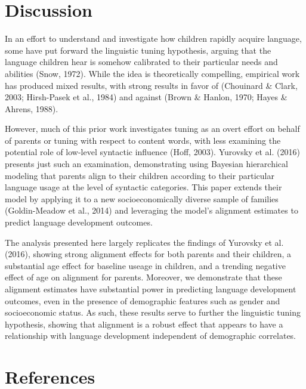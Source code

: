 \documentclass[10pt, letterpaper]{article}
\begin{document}
\hypertarget{discussion}{%
\section{Discussion}\label{discussion}}

In an effort to understand and investigate how children rapidly acquire
language, some have put forward the linguistic tuning hypothesis,
arguing that the language children hear is somehow calibrated to their
particular needs and abilities (Snow, 1972). While the idea is
theoretically compelling, empirical work has produced mixed results,
with strong results in favor of (Chouinard \& Clark, 2003; Hirsh-Pasek
et al., 1984) and against (Brown \& Hanlon, 1970; Hayes \& Ahrens,
1988).

However, much of this prior work investigates tuning as an overt effort
on behalf of parents or tuning with respect to content words, with less
examining the potential role of low-level syntactic influence (Hoff,
2003). Yurovsky et al. (2016) presents just such an examination,
demonstrating using Bayesian hierarchical modeling that parents align to
their children according to their particular language usage at the level
of syntactic categories. This paper extends their model by applying it
to a new socioeconomically diverse sample of families (Goldin-Meadow et
al., 2014) and leveraging the model's alignment estimates to predict
language development outcomes.

The analysis presented here largely replicates the findings of Yurovsky
et al. (2016), showing strong alignment effects for both parents and
their children, a substantial age effect for baseline useage in
children, and a trending negative effect of age on alignment for
parents. Moreover, we demonstrate that these alignment estimates have
substantial power in predicting language development outcomes, even in
the presence of demographic features such as gender and socioeconomic
status. As such, these results serve to further the linguistic tuning
hypothesis, showing that alignment is a robust effect that appears to
have a relationship with language development independent of demographic
correlates.

\hypertarget{references}{%
\section{References}\label{references}}

\setlength{\parindent}{-0.1in} 
\setlength{\leftskip}{0.125in}
\end{document}
